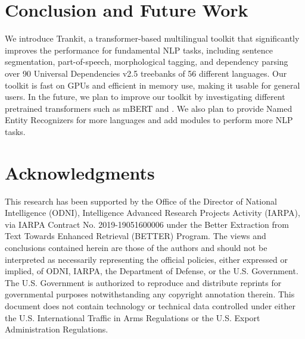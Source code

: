 \documentclass[11pt,a4paper]{article}
\begin{document}
\section{Conclusion and Future Work}
We introduce Trankit, a transformer-based multilingual toolkit that significantly improves the performance for fundamental NLP tasks, including sentence segmentation, part-of-speech, morphological tagging, and dependency parsing over 90 Universal Dependencies v2.5 treebanks of 56 different languages. Our toolkit is fast on GPUs and efficient in memory use, making it usable for general users. In the future, we plan to improve our toolkit by investigating different pretrained transformers such as mBERT and . We also plan to provide Named Entity Recognizers for more languages and add modules to perform more NLP tasks.



\section*{Acknowledgments}


This research has been supported by the Office of the Director of National Intelligence (ODNI), Intelligence Advanced Research Projects Activity (IARPA), via IARPA Contract No. 2019-19051600006 under the Better Extraction from Text Towards Enhanced Retrieval (BETTER) Program. The views and conclusions contained herein are those of the authors and should not be interpreted as necessarily representing the official policies, either expressed or implied, of ODNI, IARPA, the Department of Defense, or the U.S. Government. The U.S. Government is authorized to reproduce and distribute reprints for governmental purposes notwithstanding any copyright annotation therein. This document does not contain technology or technical data controlled under either the U.S. International Traffic in Arms Regulations or the U.S. Export Administration Regulations.



\end{document}

